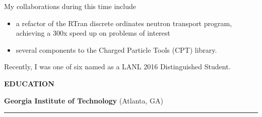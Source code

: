 \documentclass[legalpaper]{article}
\begin{document}
My collaborations during this time include
\medskip
\begin{itemize}[noitemsep, before={\vspace*{-0.5\baselineskip}}]
\item a refactor of the RTran discrete ordinates neutron transport program, achieving a 300x speed up on problems of interest
\item several components to the Charged Particle Tools (CPT) library.
\end{itemize}

Recently, I was one of six named as a LANL 2016 Distinguished Student.

\begin{center}
  \begin{shaded}
    { \color{white} \textbf{EDUCATION}}
  \end{shaded}
\end{center}
\textbf{Georgia Institute of Technology} (Atlanta, GA)\hrule \vspace{1mm}
\end{document}
